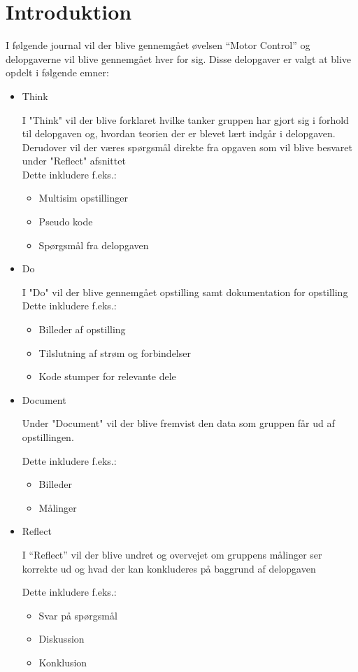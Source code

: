 \documentclass{article}
\begin{document}
\section{Introduktion}
I følgende journal vil der blive gennemgået øvelsen ``Motor Control'' og delopgaverne vil blive gennemgået hver for sig. Disse delopgaver er valgt at blive opdelt i følgende emner:
\begin{itemize}
\item Think

I "Think" vil der blive forklaret hvilke tanker gruppen har gjort sig i forhold til delopgaven og, hvordan teorien der er blevet lært indgår i delopgaven. Derudover vil der væres spørgsmål direkte fra opgaven som vil blive besvaret under "Reflect" afsnittet\\
Dette inkludere f.eks.:
\begin{itemize}
\item Multisim opstillinger
\item Pseudo kode
\item Spørgsmål fra delopgaven
\end{itemize}

\item Do

I "Do" vil der blive gennemgået opstilling samt dokumentation for opstilling
Dette inkludere f.eks.:

\begin{itemize}
\item Billeder af opstilling
\item Tilslutning af strøm og forbindelser
\item Kode stumper for relevante dele
\end{itemize}

\item Document

Under "Document" vil der blive fremvist den data som gruppen får ud af opstillingen.

Dette inkludere f.eks.:
\begin{itemize}
\item Billeder
\item Målinger
\end{itemize}


\item Reflect

I ``Reflect'' vil der blive undret og overvejet om gruppens målinger ser korrekte ud og hvad der kan konkluderes på baggrund af delopgaven

Dette inkludere f.eks.:
\begin{itemize}
\item Svar på spørgsmål
\item Diskussion
\item Konklusion
\end{itemize}

\end{itemize}
\end{document}
